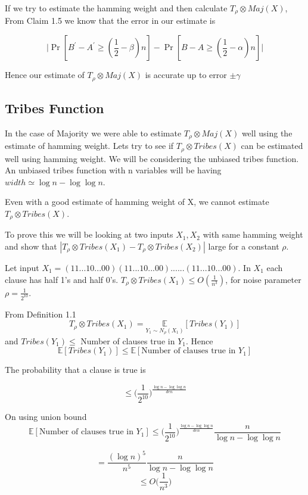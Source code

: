 \documentclass[11pt]{article}
\begin{document}
If we try to estimate the hamming weight and then calculate $T_{\rho} \otimes Maj(X)$, From Claim 1.5 we know that the error in our estimate is
 
 $$ \big| \Pr[B^{'}- A^{'}  \geq (\frac{1}{2} - \beta)n] - \Pr[B-A \geq (\frac{1}{2} - \alpha)n] \big| $$
 
Hence our estimate of $T_{\rho} \otimes Maj(X)$ is accurate up to error $\pm \gamma$
\EPF


\subsection{Tribes Function}


In the case of Majority we were able to estimate $T_{\rho} \otimes Maj(X)$ well using the estimate of hamming weight.  Lets try to see if $T_{\rho} \otimes Tribes(X)$ can be estimated well using hamming weight. We will be considering the unbiased tribes function. An unbiased tribes function with n variables will be having $width \simeq \log n - \log \log n$. 

\BT
Even with a good estimate of hamming weight of X, we cannot estimate $T_{\rho} \otimes Tribes(X)$.

\ET
 
 To prove this we will be looking at two inputs $X_1, X_2$ with same hamming weight and show that $| T_{\rho} \otimes Tribes(X_1) - T_{\rho} \otimes Tribes(X_2)|$ large for a constant $\rho$.

\BCM
Let input $X_1= (11...10...00)(11...10...00)......(11...10...00)$. In $X_1$ each clause has half 1's and half 0's. $T_{\rho} \otimes Tribes(X_1) \leq O(\frac{1}{n^3})$, for noise parameter $\rho = \frac{1}{2^{10}}$.

\ECM

\BPF
From Definition 1.1 $$T_{\rho} \otimes Tribes(X_1) = \underset{Y_1 \sim N_{\rho}(X_1)}{\mathbb{E}}[Tribes(Y_1)]$$
and $Tribes(Y_1) \leq$ Number of clauses true in $Y_1$. Hence 
$${\mathbb{E}}[Tribes(Y_1)] \leq {\mathbb{E}}[\text{Number of clauses true in } Y_1]$$

The probability that a clause is true is 

$$\leq \Big(\frac{1}{2^{10}} \Big)^{\frac{\log n -\log \log n}{den}} $$

On using union bound 
$${\mathbb{E}}[\text{Number of clauses true in } Y_1] \leq \Big(\frac{1}{2^{10}} \Big)^{\frac{\log n -\log \log n}{den}} \frac{n}{\log n - \log \log n} $$

$$= \frac{(\log n)^5}{n^5} \frac{n}{\log n - \log \log n}$$
$$\leq O\Big(\frac{1}{n^3}\Big)$$
\end{document}
